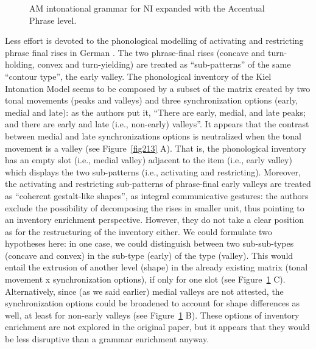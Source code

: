 \begin{figure}
\centering
{}
\caption{AM intonational grammar for NI expanded with the Accentual Phrase level.}
\label{fig212}\end{figure}

Less effort is devoted to the phonological modelling of activating and restricting phrase final rises in German \citep{dombrowski2005acoustic}. The two phrase-final rises (concave and turn-holding, convex and turn-yielding) are treated as ``sub-patterns'' of the same ``contour type'', the early valley. The phonological inventory of the Kiel Intonation Model seems to be composed by a subset of the matrix created by two tonal movements (peaks and valleys) and three synchronization options (early, medial and late): as the authors put it, ``There are early, medial, and late peaks; and there are early and late (i.e., non-early) valleys''. It appears that the contrast between medial and late synchronizations options is neutralized when the tonal movement is a valley (see Figure~\ref{fig213} A). That is, the phonological inventory has an empty slot (i.e., medial valley) adjacent to the item (i.e., early valley) which displays the two sub-patterns (i.e., activating and restricting). Moreover, the activating and restricting sub-patterns of phrase-final early valleys are treated as ``coherent gestalt-like shapes'', as integral communicative gestures: the authors exclude the possibility of decomposing the rises in smaller unit, thus pointing to an inventory enrichment perspective. However, they do not take a clear position as for the restructuring of the inventory either. We could formulate two hypotheses here: in one case, we could distinguish between two sub-sub-types (concave and convex) in the sub-type (early) of the type (valley). This would entail the extrusion of another level (shape) in the already existing matrix (tonal movement x synchronization options), if only for one slot (see Figure~\ref{fig212} C). Alternatively, since (as we said earlier) medial valleys are not attested, the synchronization options could be broadened to account for shape differences as well, at least for non-early valleys (see Figure~\ref{fig212} B). These options of inventory enrichment are not explored in the original paper, but it appears that they would be less disruptive than a grammar enrichment anyway.

